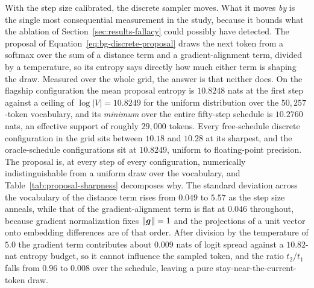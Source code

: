 With the step size calibrated, the discrete sampler moves. What it moves \emph{by} is the single most consequential measurement in the study, because it bounds what the ablation of Section~\ref{sec:results-fallacy} could possibly have detected. The proposal of Equation~\eqref{eq:bg-discrete-proposal} draws the next token from a softmax over the sum of a distance term and a gradient-alignment term, divided by a temperature, so its entropy says directly how much either term is shaping the draw. Measured over the whole grid, the answer is that neither does. On the flagship configuration the mean proposal entropy is $10.8248$ nats at the first step against a ceiling of $\log|V| = 10.8249$ for the uniform distribution over the $50{,}257$-token vocabulary, and its \emph{minimum} over the entire fifty-step schedule is $10.2760$ nats, an effective support of roughly $29{,}000$ tokens. Every free-schedule discrete configuration in the grid sits between $10.18$ and $10.28$ at its sharpest, and the oracle-schedule configurations sit at $10.8249$, uniform to floating-point precision.
The proposal is, at every step of every configuration, numerically indistinguishable from a uniform draw over the vocabulary, and Table~\ref{tab:proposal-sharpness} decomposes why. The standard deviation across the vocabulary of the distance term rises from $0.049$ to $5.57$ as the step size anneals, while that of the gradient-alignment term is flat at $0.046$ throughout, because gradient normalization fixes $\left\lVert\bm{g}\right\rVert = 1$ and the projections of a unit vector onto embedding differences are of that order. After division by the temperature of $5.0$ the gradient term contributes about $0.009$ nats of logit spread against a $10.82$-nat entropy budget, so it cannot influence the sampled token, and the ratio $t_2 / t_1$ falls from $0.96$ to $0.008$ over the schedule, leaving a pure stay-near-the-current-token draw.

